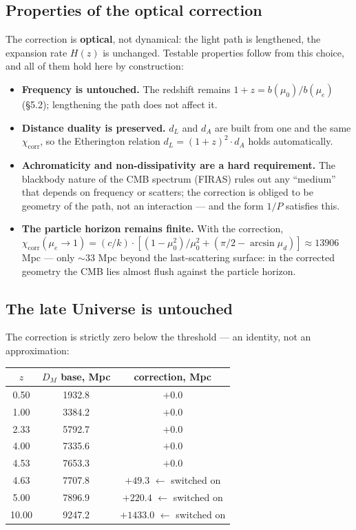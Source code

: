 \documentclass{article}
\begin{document}
\subsection{Properties of the optical correction}

The correction is \textbf{optical}, not dynamical: the light path is lengthened, the expansion rate $H(z)$ is unchanged. Testable properties follow from this choice, and all of them hold here by construction:
\begin{itemize}
  \item \textbf{Frequency is untouched.} The redshift remains $1+z = b(\mu_0)/b(\mu_e)$ (\S5.2); lengthening the path does not affect it.
  \item \textbf{Distance duality is preserved.} $d_L$ and $d_A$ are built from one and the same $\chi_{\text{corr}}$, so the Etherington relation $d_L = (1+z)^2\cdot d_A$ holds automatically.
  \item \textbf{Achromaticity and non-dissipativity are a hard requirement.} The blackbody nature of the CMB spectrum (FIRAS) rules out any ``medium'' that depends on frequency or scatters; the correction is obliged to be geometry of the path, not an interaction --- and the form $1/P$ satisfies this.
  \item \textbf{The particle horizon remains finite.} With the correction, $\chi_{\text{corr}}(\mu_e \to 1) = (c/k)\cdot[(1-\mu_0^2)/\mu_0^2 + (\pi/2 - \arcsin\mu_d)] \approx 13906$ Mpc --- only ${\sim}33$ Mpc beyond the last-scattering surface: in the corrected geometry the CMB lies almost flush against the particle horizon.
\end{itemize}

\subsection{The late Universe is untouched}

The correction is strictly zero below the threshold --- an identity, not an approximation:

\begin{table}[htbp]
\centering
\small
\begin{tabular}{@{}ccc@{}}
\toprule
$z$ & $D_M$ base, Mpc & correction, Mpc \\
\midrule
0.50 & 1932.8 & $+0.0$ \\
1.00 & 3384.2 & $+0.0$ \\
2.33 & 5792.7 & $+0.0$ \\
4.00 & 7335.6 & $+0.0$ \\
4.53 & 7653.3 & $+0.0$ \\
4.63 & 7707.8 & $+49.3$ \; $\leftarrow$ switched on \\
5.00 & 7896.9 & $+220.4$ \; $\leftarrow$ switched on \\
10.00 & 9247.2 & $+1433.0$ \; $\leftarrow$ switched on \\
\bottomrule
\end{tabular}
\end{table}
\end{document}
